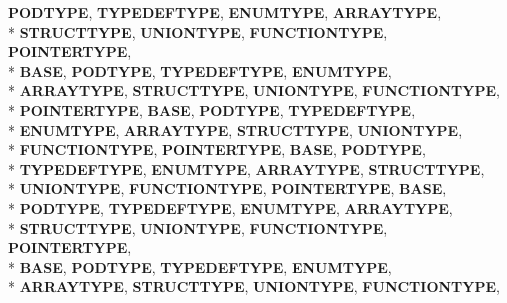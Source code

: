 \begin{DoxyCompactItemize}
{\bfseries P\-O\-D\-T\-Y\-P\-E}, 
{\bfseries T\-Y\-P\-E\-D\-E\-F\-T\-Y\-P\-E}, 
{\bfseries E\-N\-U\-M\-T\-Y\-P\-E}, 
{\bfseries A\-R\-R\-A\-Y\-T\-Y\-P\-E}, 
\\*
{\bfseries S\-T\-R\-U\-C\-T\-T\-Y\-P\-E}, 
{\bfseries U\-N\-I\-O\-N\-T\-Y\-P\-E}, 
{\bfseries F\-U\-N\-C\-T\-I\-O\-N\-T\-Y\-P\-E}, 
{\bfseries P\-O\-I\-N\-T\-E\-R\-T\-Y\-P\-E}, 
\\*
{\bfseries B\-A\-S\-E}, 
{\bfseries P\-O\-D\-T\-Y\-P\-E}, 
{\bfseries T\-Y\-P\-E\-D\-E\-F\-T\-Y\-P\-E}, 
{\bfseries E\-N\-U\-M\-T\-Y\-P\-E}, 
\\*
{\bfseries A\-R\-R\-A\-Y\-T\-Y\-P\-E}, 
{\bfseries S\-T\-R\-U\-C\-T\-T\-Y\-P\-E}, 
{\bfseries U\-N\-I\-O\-N\-T\-Y\-P\-E}, 
{\bfseries F\-U\-N\-C\-T\-I\-O\-N\-T\-Y\-P\-E}, 
\\*
{\bfseries P\-O\-I\-N\-T\-E\-R\-T\-Y\-P\-E}, 
{\bfseries B\-A\-S\-E}, 
{\bfseries P\-O\-D\-T\-Y\-P\-E}, 
{\bfseries T\-Y\-P\-E\-D\-E\-F\-T\-Y\-P\-E}, 
\\*
{\bfseries E\-N\-U\-M\-T\-Y\-P\-E}, 
{\bfseries A\-R\-R\-A\-Y\-T\-Y\-P\-E}, 
{\bfseries S\-T\-R\-U\-C\-T\-T\-Y\-P\-E}, 
{\bfseries U\-N\-I\-O\-N\-T\-Y\-P\-E}, 
\\*
{\bfseries F\-U\-N\-C\-T\-I\-O\-N\-T\-Y\-P\-E}, 
{\bfseries P\-O\-I\-N\-T\-E\-R\-T\-Y\-P\-E}, 
{\bfseries B\-A\-S\-E}, 
{\bfseries P\-O\-D\-T\-Y\-P\-E}, 
\\*
{\bfseries T\-Y\-P\-E\-D\-E\-F\-T\-Y\-P\-E}, 
{\bfseries E\-N\-U\-M\-T\-Y\-P\-E}, 
{\bfseries A\-R\-R\-A\-Y\-T\-Y\-P\-E}, 
{\bfseries S\-T\-R\-U\-C\-T\-T\-Y\-P\-E}, 
\\*
{\bfseries U\-N\-I\-O\-N\-T\-Y\-P\-E}, 
{\bfseries F\-U\-N\-C\-T\-I\-O\-N\-T\-Y\-P\-E}, 
{\bfseries P\-O\-I\-N\-T\-E\-R\-T\-Y\-P\-E}, 
{\bfseries B\-A\-S\-E}, 
\\*
{\bfseries P\-O\-D\-T\-Y\-P\-E}, 
{\bfseries T\-Y\-P\-E\-D\-E\-F\-T\-Y\-P\-E}, 
{\bfseries E\-N\-U\-M\-T\-Y\-P\-E}, 
{\bfseries A\-R\-R\-A\-Y\-T\-Y\-P\-E}, 
\\*
{\bfseries S\-T\-R\-U\-C\-T\-T\-Y\-P\-E}, 
{\bfseries U\-N\-I\-O\-N\-T\-Y\-P\-E}, 
{\bfseries F\-U\-N\-C\-T\-I\-O\-N\-T\-Y\-P\-E}, 
{\bfseries P\-O\-I\-N\-T\-E\-R\-T\-Y\-P\-E}, 
\\*
{\bfseries B\-A\-S\-E}, 
{\bfseries P\-O\-D\-T\-Y\-P\-E}, 
{\bfseries T\-Y\-P\-E\-D\-E\-F\-T\-Y\-P\-E}, 
{\bfseries E\-N\-U\-M\-T\-Y\-P\-E}, 
\\*
{\bfseries A\-R\-R\-A\-Y\-T\-Y\-P\-E}, 
{\bfseries S\-T\-R\-U\-C\-T\-T\-Y\-P\-E}, 
{\bfseries U\-N\-I\-O\-N\-T\-Y\-P\-E}, 
{\bfseries F\-U\-N\-C\-T\-I\-O\-N\-T\-Y\-P\-E}, 

\end{DoxyCompactItemize}
